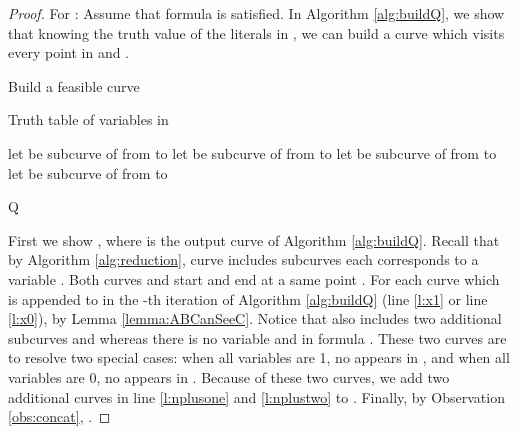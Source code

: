 \documentclass[a4paper,UKenglish]{lipics}
\begin{document}
\begin{proof}


For : 
Assume that  formula  is satisfied. 
In Algorithm \ref{alg:buildQ}, we show that 
knowing the truth value of the literals in , 
we can build a curve  which 
visits every point in  and .



\begin{algorithm} [h]
\caption {{\sc Build a feasible curve  }} 
\label{alg:buildQ}
\begin{algorithmic}[1]	
		\baselineskip
	\REQUIRE  Truth table of variables  in 

	\STATE 
	\STATE  \label{l:startPoint}
	 
	\IF {}
	\STATE 
	\STATE let  be  subcurve of  from 	 to 
	\STATE let  be  subcurve of  from 	 to 
	\STATE   \label{l:visitCone}
	\ENDFOR
	\STATE  \label{l:x1}
	\ELSE 	
	\STATE 
	\STATE let  be  subcurve of  from 	 to 
	\STATE let  be  subcurve of  from 	 to 
	\STATE  \label{l:visitCzero}
	\ENDFOR
	\STATE  \label{l:x0}

	\ENDIF
	\STATE 



	\ENDFOR
	\STATE \label{l:nplusone}
	\STATE 

	\STATE \label{l:nplustwo}
	\STATE   \label{l:endPoint}

	 {\sc Q}  
\end{algorithmic}
\end{algorithm}






First we show , where 
is the output curve of Algorithm \ref{alg:buildQ}.
Recall that by Algorithm \ref{alg:reduction}, 
curve  includes  subcurves  each corresponds 
to a variable . 
Both 
curves  and  start and end at a same point .
For each curve  which is appended to  
in the -th iteration of Algorithm \ref{alg:buildQ} 
(line \ref{l:x1} or line \ref{l:x0}), 
  by Lemma \ref{lemma:ABCanSeeC}. 
Notice that  also includes two additional subcurves  and  whereas there is no variable  and  in formula . These two curves are to resolve two special cases: 
when all variables  are 1,  no  appears in ,
and when all variables  are 0,  no  appears in .
Because of these two curves, 
we add two additional curves in line \ref{l:nplusone}
and \ref{l:nplustwo} to . Finally, by  Observation 
\ref{obs:concat}, .


\end{proof}
\end{document}
